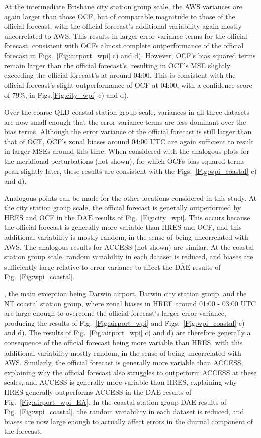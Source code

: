 \documentclass[twocol]{ametsoc}
\begin{document}
At the intermediate Brisbane city station group scale, the AWS variances are again larger than those OCF, but of comparable magnitude to those of the official forecast, with the official forecast's additional variability again mostly uncorrelated to AWS. This results in larger error variance terms for the official forecast, consistent with OCFs almost complete outperformance of the official forecast in Figs.~\ref{Fig:airport_wpi} c) and d). However, OCF's bias squared terms remain larger than the official forecast's, resulting in OCF's MSE slightly exceeding the official forecast's at around 04:00. This is consistent with the official forecast's slight outperformance of OCF at 04:00, with a confidence score of $79\%$, in Figs.\ref{Fig:city_wpi} c) and d).  

Over the coarse QLD coastal station group scale, variances in all three datasets are now small enough that the error variance terms are less dominant over the bias terms. Although the error variance of the official forecast is still larger than that of OCF, OCF's zonal biases around 04:00 UTC are again sufficient to result in larger MSEs around this time. When considered with the analogous plots for the meridional perturbations (not shown), for which OCFs bias squared terms peak slightly later, these results are consistent with the Figs.~\ref{Fig:wpi_coastal} c) and d). 

Analogous points can be made for the other locations considered in this study. At the city station group scale, the official forecast is generally outperformed by HRES and OCF in the $\overline{\text{DAE}}$ results of Fig.~\ref{Fig:city_wpi}. This occurs because the official forecast is generally more variable than HRES and OCF, and this additional variability is mostly random, in the sense of being uncorrelated with AWS. The analogous results for ACCESS (not shown) are similar. At the coastal station group scale, random variability in each dataset is reduced, and biases are sufficiently large relative to error variance to affect the $\overline{\text{DAE}}$ results of Fig.~\ref{Fig:wpi_coastal}.




, the main exception being Darwin airport, Darwin city station group, and the NT coastal station group, where zonal biases in HREF around 01:00 - 03:00 UTC are large enough to overcome the official forecast's larger error variance, producing the results of Fig.~\ref{Fig:airport_wpi} and Figs.~\ref{Fig:wpi_coastal} c) and d). The results of Fig.~\ref{Fig:airport_wpi} c) and d) are therefore generally a consequence of the official forecast being more variable than HRES, with this additional variability mostly random, in the sense of being uncorrelated with AWS. Similarly, the official forecast is generally more variable than ACCESS, explaining why the official forecast also struggles to outperform ACCESS at these scales, and ACCESS is generally more variable than HRES, explaining why HRES generally outperforms ACCESS in the DAE results of Fig.~\ref{Fig:airport_wpi_EA}. In the coastal station group DAE results of Fig.~\ref{Fig:wpi_coastal}, the random variability in each dataset is reduced, and biases are now large enough to actually affect errors in the diurnal component of the forecast.  
\end{document}
